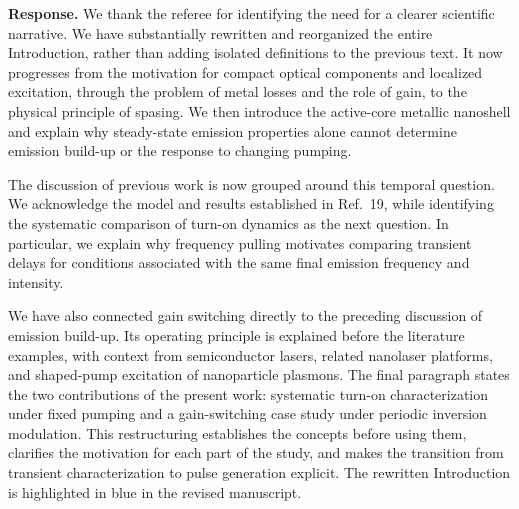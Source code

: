 \documentclass[11pt,a4paper]{article}
\newcommand{\response}[1]{\par\textbf{Response.} #1\par}
\begin{document}
\response{We thank the referee for identifying the need for a clearer scientific narrative. We have substantially rewritten and reorganized the entire Introduction, rather than adding isolated definitions to the previous text. It now progresses from the motivation for compact optical components and localized excitation, through the problem of metal losses and the role of gain, to the physical principle of spasing. We then introduce the active-core metallic nanoshell and explain why steady-state emission properties alone cannot determine emission build-up or the response to changing pumping.

The discussion of previous work is now grouped around this temporal question. We acknowledge the model and results established in Ref.~19, while identifying the systematic comparison of turn-on dynamics as the next question. In particular, we explain why frequency pulling motivates comparing transient delays for conditions associated with the same final emission frequency and intensity.

We have also connected gain switching directly to the preceding discussion of emission build-up. Its operating principle is explained before the literature examples, with context from semiconductor lasers, related nanolaser platforms, and shaped-pump excitation of nanoparticle plasmons. The final paragraph states the two contributions of the present work: systematic turn-on characterization under fixed pumping and a gain-switching case study under periodic inversion modulation. This restructuring establishes the concepts before using them, clarifies the motivation for each part of the study, and makes the transition from transient characterization to pulse generation explicit. The rewritten Introduction is highlighted in blue in the revised manuscript.}
\end{document}
